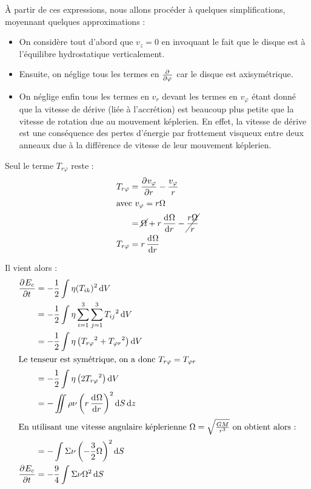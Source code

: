 À partir de ces expressions, nous allons procéder à quelques simplifications, moyennant quelques approximations : 
\begin{itemize}
\item On considère tout d'abord que $v_z=0$ en invoquant le fait que le disque est à l'équilibre hydrostatique verticalement. 

\item Ensuite, on néglige tous les termes en $\pd{}{\varphi}$ car le disque est axisymétrique. 

\item On néglige enfin tous les termes en $v_r$ devant les termes en $v_\varphi$ étant donné que la vitesse de dérive (liée à l'accrétion) est beaucoup plus petite que la vitesse de rotation due au mouvement képlerien. En effet, la vitesse de dérive est une conséquence des pertes d'énergie par frottement visqueux entre deux anneaux due à la différence de vitesse de leur mouvement képlerien.
\end{itemize}




Seul le terme $T_{r\varphi}$ reste :
\begin{align}
T_{r\varphi} &= \dpd{v_\varphi}{r} - \frac{v_\varphi}{r}\nonumber\\
\intertext{avec $v_\varphi=r\Omega$}
&= \cancel{\Omega} + r\dod{\Omega}{r} - \cancel{\frac{r\Omega}{r}}\nonumber\\
T_{r\varphi} &= r\dod{\Omega}{r}
\end{align}

Il vient alors :
\begin{align*}
\dpd{E_c}{t} &= - \frac{1}{2}\int \eta(T_{ik})^2\dif V\\
&= - \frac{1}{2}\int \eta\sum_{i=1}^3\sum_{j=1}^3 {T_{ij}}^2\dif V\\
&= - \frac{1}{2}\int \eta\left({T_{r\varphi}}^2+{T_{\varphi r}}^2\right)\dif V\\
\intertext{Le tenseur est symétrique, on a donc $T_{r\varphi} = T_{\varphi r}$}
&= - \frac{1}{2}\int \eta\left(2{T_{r\varphi}}^2\right)\dif V\\
&= - \iint \rho\nu \left(r\dod{\Omega}{r}\right)^2\dif S\dif z\\
\intertext{En utilisant une vitesse angulaire képlerienne $\Omega=\sqrt{\frac{GM}{r^3}}$ on obtient alors :}
&= - \int \Sigma\nu \left(-\frac{3}{2}\Omega\right)^2\dif S\\
\dpd{E_c}{t} &= - \frac{9}{4} \int \Sigma\nu \Omega^2\dif S
\end{align*}

